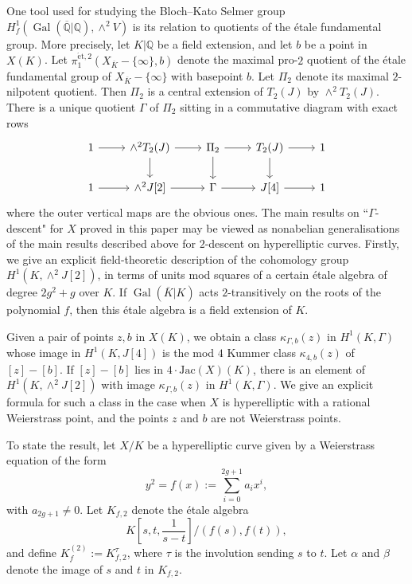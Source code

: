 \documentclass[11pt]{amsart}
\def\Q{\mathbb Q}
\theoremstyle{plain}
\theoremstyle{definition}
\DeclareMathOperator{\Gal}{Gal}
\newcommand{\Jac}{\mathrm{Jac}}
\newcommand{\et}{\mathrm{\acute{e}t}}
\begin{document}
One tool used for studying the Bloch--Kato Selmer group $H^1 _f (\Gal (\overline{\Q }|\Q ),\wedge ^2 V)$ is its relation to quotients of the \'etale fundamental group. More precisely, let $K|\Q $ be a field extension, and let $b$ be a point in $X(K)$. Let $\pi _1 ^{\et ,2}(X_{\overline{K}}-\{ \infty \} ,b)$ denote the maximal pro-$2$ quotient of the \'etale fundamental group of $X_{\overline{K}}-\{ \infty \} $ with basepoint $b$. Let $\Pi _2 $ denote its maximal $2$-nilpotent quotient. Then $\Pi _2 $ is a central extension of $T_2 (J)$ by $\wedge ^2 T_2 (J)$.
There is a unique quotient $\Gamma $ of $\Pi _2 $ sitting in a commutative diagram with exact rows
\begin{equation}\label{eqn:gammabar}
\begin{tikzcd}
1 \arrow[r] & \wedge ^2 T_2 (J) \arrow[d] \arrow[r] & \Pi _2 \arrow[d] \arrow[r] & T_2 (J) \arrow[d] \arrow[r] & 1 \\
1 \arrow[r] & \wedge ^2 J[2] \arrow[r]           & \Gamma  \arrow[r]           & J[4] \arrow[r]           & 1
\end{tikzcd}
\end{equation}
where the outer vertical maps are the obvious ones. The main results on ``$\Gamma$-descent" for $X$ proved in this paper may be viewed as nonabelian generalisations of the main results described above for $2$-descent on hyperelliptic curves. Firstly, we give an explicit field-theoretic description of the cohomology group $H^1 (K,\wedge ^2 J[2])$, in terms of units mod squares of a certain \'etale algebra of degree $2g^2 +g$ over $K$. If $\Gal (\overline{K}|K)$ acts $2$-transitively on the roots of the polynomial $f$, then this \'etale algebra is a field extension of $K$.

Given a pair of points $z,b$ in $X(K)$, we obtain a class $\kappa _{\Gamma  ,b}(z)$ in $H^1 (K,\Gamma )$ whose image in $H^1 (K,J[4])$ is the mod $4$ Kummer class $\kappa _{4,b}(z)$ of $[z]-[b]$. If $[z]-[b]$ lies in $4\cdot \Jac (X)(K)$, there is an element of $H^1 (K,\wedge ^2 J[2])$ with image $\kappa _{\Gamma  ,b}(z)$ in $H^1 (K,\Gamma  )$. We give an explicit formula for such a class in the case when $X$ is hyperelliptic with a rational Weierstrass point, and the points $z$ and $b$ are not Weierstrass points.

To state the result, let $X/K$ be a hyperelliptic curve given by a Weierstrass equation of the form
\[
y^2 =f(x):=\sum _{i=0}^{2g+1}a_i x^i ,
\]
with $a_{2g+1}\neq 0$. 
Let $K_{f,2}$ denote the \'etale algebra
\[
K[s,t,\frac{1}{s-t}]/(f(s),f(t)),
\] 
and define $K_f ^{(2)}:=K_{f,2}^{\tau }$, where $\tau $ is the involution sending $s$ to $t$. Let $\alpha $ and $\beta $ denote the image of $s$ and $t$ in $K_{f,2}$.
\end{document}
